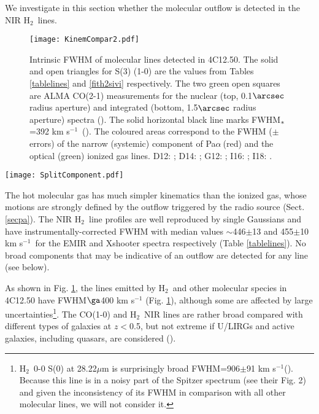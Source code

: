 \documentclass{aa}
\newcommand{\kms}{km s$^{-1}$~}
\newcommand{\kmsb}{km s$^{-1}$}
\newcommand{\pa}{Pa$\alpha~$}
\newcommand{\hmol}{H$_2$~}
\begin{document}
We investigate in this section whether the molecular outflow is detected in the NIR \hmol lines.
 

\begin{figure}
\centering
\texttt{[image: KinemCompar2.pdf]}
\caption{Intrinsic FWHM  of molecular lines detected in 4C12.50.   The solid and open triangles for  S(3) (1-0) are the values from Tables \ref{tablelines}  and \ref{fith2sivi}  respectively. The two green open squares are ALMA CO(2-1)  measurements for the nuclear (top, 0.1$\arcsec$ radius aperture) and integrated (bottom, 1.5$\arcsec$ radius aperture) spectra (\citealt{Lamperti2022}). The solid  horizontal black line marks  FWHM$_{\rm *}$=392 \kms (\citealt{Dasyra2006}).  The  coloured areas correspond to the FWHM ($\pm$errors) of the narrow (systemic)  component of \pa (red) and the optical (green) ionized gas lines. D12: \citealt{Dasyra2012}; D14: \citealt{Dasyra2014}; G12: \citealt{Guillard2012}; I16: \citealt{Imanishi2016}; I18: \citealt{Imanishi2018}.}
\label{compkinem}
\end{figure}


\begin{figure*}
\texttt{[image: SplitComponent.pdf]}
\caption{Observed emission (black) of \hmol S(5) (left), S(2) (middle) and S(1) (right) and the expected profiles (red), for which we assume  the presence of a molecular outflow with similar kinematic properties and relative flux contribution as in the MIR \hmol lines. The troughs at the peak of the S(2) and S(1) are due to the noise.}
\label{split}
\end{figure*}

The hot molecular gas has much simpler kinematics than the ionized gas, whose motions are strongly defined by the   outflow triggered by the radio source (Sect. \ref{secpa}).    The NIR  \hmol line profiles are well reproduced by single Gaussians  and have instrumentally-corrected FWHM with median values $\sim$446$\pm$13  and 455$\pm$10   \kms for the EMIR and Xshooter spectra respectively (Table \ref{tablelines}). No broad components that may be indicative of an outflow are detected for any line (see below).  


As shown in Fig. \ref{compkinem}, the lines emitted by \hmol and other molecular species in 4C12.50 have  FWHM$\ga$400 km s$^{-1}$  (Fig. \ref{compkinem}), although some are affected by large uncertainties\footnote{\hmol   0-0 S(0) at 28.22$\mu$m is surprisingly broad FWHM=906$\pm$91 \kmsb  (\citealt{Guillard2012}). Because this line   is in a noisy part of the Spitzer spectrum (see their Fig. 2) and given the inconsistency of its FWHM in comparison with all other molecular lines, we will not consider it.}. The CO(1-0)  and \hmol NIR lines are rather broad compared with different types of galaxies at $z<$0.5, but not extreme if U/LIRGs and active galaxies, including quasars, are  considered (\citealt{Murphy2001,Ardila2004,Ardila2005,Colina2005,Piqueras2012,Riffel2013,Villar2013,Cortzen2019,Ramos2022,Lamperti2022}). 
\end{document}
